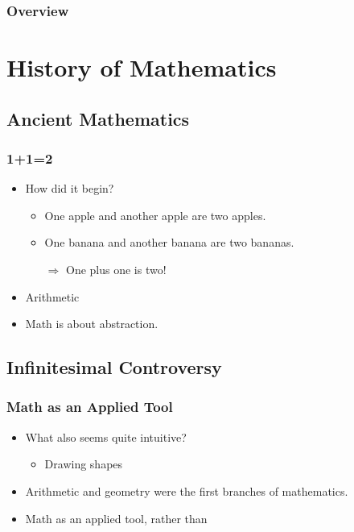 \documentclass{beamer}
\begin{document}

\begin{frame}
    \frametitle{Overview} 
        \tableofcontents
\end{frame}

\section{History of Mathematics}
\subsection{Ancient Mathematics}
\begin{frame}
    \frametitle{1+1=2}
    \begin{itemize}[<+->]
	\item How did it begin?
	\begin{itemize}
		\item One apple and another apple are two apples.
		\item One banana and another banana are two bananas.
		\item[$\Rightarrow$] One plus one is two!
	\end{itemize}
	\item Arithmetic
	\item Math is about abstraction.
    \end{itemize}
\end{frame}
\subsection{Infinitesimal Controversy}
\begin{frame}
    \frametitle{Math as an Applied Tool}
    \begin{itemize}[<+->]
	\item What also seems quite intuitive?
	\begin{itemize}
		\item Drawing shapes
	\end{itemize}
	\item Arithmetic and geometry were the first branches of mathematics.
	\item Math as an applied tool, rather than 
    \end{itemize}
\end{frame}
\end{document}
